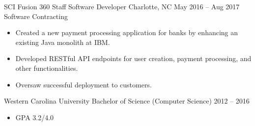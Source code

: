 \documentclass[10pt, a4paper]{cvhari}
\begin{document}
    \smallskip
    \divider
    \smallskip

    \company
        {SCI Fusion 360}
        {Staff Software Developer}
        {Charlotte, NC}
        {May 2016 -- Aug 2017}
        {Software Contracting}
        
        \begin{itemize}
            \item Created a new payment processing application for banks by enhancing an existing Java monolith at IBM. \smallskip
            \item Developed RESTful API endpoints for user creation, payment processing, and other functionalities.\smallskip
            \item Oversaw successful deployment to customers.\medskip
        \end{itemize}
    \medskip

    \medskip
    \education
        {Western Carolina University}
        {Bachelor of Science (Computer Science)}
        {2012 -- 2016}
        \par
        \smallskip
        \begin{itemize}
            \item GPA 3.2/4.0
        \end{itemize}
\end{document}

